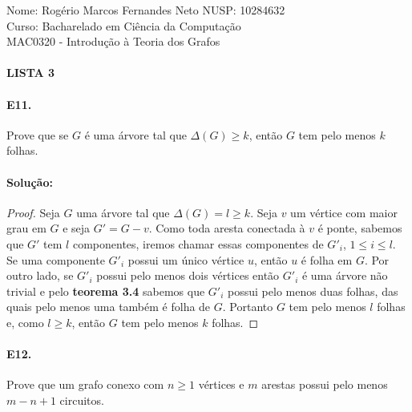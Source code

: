 \documentclass[11pt,a4paper,notitlepage]{exam}
\begin{document}
\begin{center}
  Nome: Rogério Marcos Fernandes Neto\hphantom{xxx} NUSP: 10284632\\
  Curso: Bacharelado em Ciência da Computação\\
  MAC0320 - Introdução à Teoria dos Grafos
  \paragraph{}
  \textbf{LISTA 3}
\end{center}
\paragraph{E11.} Prove que se $G$ é uma árvore tal que $\Delta(G) \geq k$, então $G$ tem pelo menos $k$ folhas.
\paragraph{Solução:}
\begin{proof}
  Seja $G$ uma árvore tal que $\Delta(G) = l \geq k$. Seja $v$ um vértice com maior grau em $G$ e seja $G' = G - v$. Como toda aresta conectada à $v$ é ponte, sabemos que $G'$ tem $l$ componentes,  iremos chamar essas componentes de $G'_i$, $1\leq i \leq l$. Se uma componente $G'_i$ possui um único vértice $u$, então $u$ é folha em $G$. Por outro lado, se $G'_i$ possui pelo menos dois vértices então $G'_i$ é uma árvore não trivial e pelo \textbf{teorema 3.4} sabemos que $G'_i$ possui pelo menos duas folhas, das quais pelo menos uma também é folha de $G$. Portanto $G$ tem pelo menos $l$ folhas e, como $l \geq k$, então $G$ tem pelo menos $k$ folhas.
\end{proof}
\paragraph{E12.} Prove que um grafo conexo com $n \geq 1$ vértices e $m$ arestas possui pelo menos $m - n + 1$ circuitos.
\end{document}
